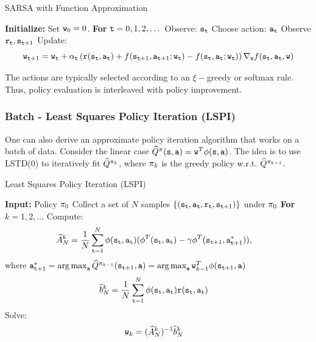\begin{algorithm}[H]
\caption{SARSA with Function Approximation}
\begin{algorithmic}[1]
\State \textbf{Initialize:} Set ${\tt w}_0 = 0$.
\State \textbf{For} {${\tt t} = 0, 1, 2, \dots$}
    \State \quad Observe: ${\tt s}_{\tt t}$ 
    \State \quad Choose action: ${\tt a}_{\tt t}$ 
    \State \quad Observe ${\tt r}_{\tt t}, {\tt s}_{{\tt t}+1}$
    \State \quad Update:
    \begin{equation*}
    {\tt w}_{{\tt t}+1} = {\tt w}_{\tt t} + \alpha_{\tt t} \left( {\tt r}({\tt s}_{\tt t},{\tt a}_{\tt t}) + f({\tt s}_{{\tt t}+1},{\tt a}_{{\tt t}+1};{\tt w}_{\tt t}) - f({\tt s}_{{\tt t}},{\tt a}_{{\tt t}}; {\tt w}_{\tt t}) \right) \nabla_{{\tt w}} f({\tt s}_{\tt t},{\tt a}_{\tt t},{\tt w})
\end{equation*}
\end{algorithmic}
\end{algorithm}

The actions are typically selected according to an $\xi-$greedy or softmax rule. Thus, policy evaluation is interleaved with policy improvement.

\subsubsection{Batch - Least Squares Policy Iteration (LSPI)}
One can also derive an approximate policy iteration algorithm that works on a batch of data. Consider the linear case $\widehat{Q}^\pi({\tt s},{\tt a}) = {\tt w}^T \phi({\tt s},{\tt a})$. The idea is to use LSTD(0) to iteratively fit $\widehat{Q}^{\pi_k}$, where $\pi_k$ is the greedy policy w.r.t. $\widehat{Q}^{\pi_{k-1}}$.


\begin{algorithm}[H]
\caption{Least Squares Policy Iteration (LSPI)}
\begin{algorithmic}[1]
\State \textbf{Input:} Policy $\pi_0$
\State Collect a set of $N$ samples $\{({\tt s}_{\tt t}, {\tt a}_{\tt t}, {\tt r}_{\tt t}, {\tt s}_{{\tt t}+1})\}$ under $\pi_0$
\State \textbf{For} {$k = 1,2,\dots$ }
    \State \quad Compute: 
\begin{align*}
\widehat{A}_N^k &= \frac{1}{N} \sum_{{\tt t}=1}^N {\phi}({\tt s}_{\tt t},{\tt a}_{\tt t})( {\phi}^T({\tt s}_{\tt t},{\tt a}_{\tt t})-\gamma {\phi}^T({\tt s}_{{\tt t}+1},{\tt a}^*_{{\tt t}+1})),
\end{align*}
\qquad where 
$\action^*_{\ttime+1} = \argmax_\action \widehat{Q}^{\policy_{k-1}}(\state_{\ttime+1},\action) = \argmax_\action \weights_{k-1}^T\ftrs(\state_{\ttime+1},\action)$
\begin{align*}
\widehat{b}_N^k &= \frac{1}{N} \sum_{{\tt t}=1}^N  {\phi}({\tt s}_{\tt t}, {\tt a}_{\tt t}) {\tt r}({\tt s}_{\tt t},{\tt a}_{\tt t}) 
\end{align*}
\State \quad Solve: 
\begin{align*}
{\tt w}_k &= (\widehat{A}_N^k)^{-1} \widehat{b}_N^k
\end{align*}
\end{algorithmic}
\end{algorithm}

